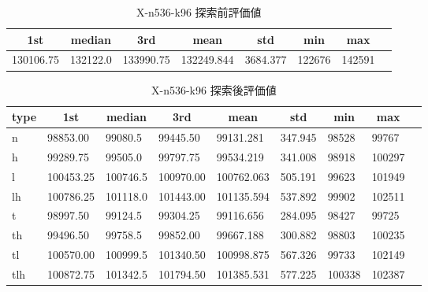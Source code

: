 \begin{table}[htbp]
    \centering
    \caption{X-n536-k96 探索前評価値}
    \begin{tabular}{|l|l|l|l|l|l|l|l|}\hline
    \multicolumn{1}{|c|}{\textbf{1st}}
    &\multicolumn{1}{c|}{\textbf{median}}
    &\multicolumn{1}{c|}{\textbf{3rd}}
    &\multicolumn{1}{c|}{\textbf{mean}}
    &\multicolumn{1}{c|}{\textbf{std}}
    &\multicolumn{1}{c|}{\textbf{min}}
    &\multicolumn{1}{c|}{\textbf{max}}\\\hline
	130106.75 & 132122.0 & 133990.75 & 132249.844 & 3684.377 & 122676 & 142591\\\hline
	\end{tabular}
\end{table}
\begin{table}[htbp]
    \centering
    \caption{X-n536-k96 探索後評価値}
    \begin{tabular}{|l|l|l|l|l|l|l|l|l|}\hline
    \multicolumn{1}{|c|}{\textbf{type}}
    &\multicolumn{1}{|c|}{\textbf{1st}}
    &\multicolumn{1}{c|}{\textbf{median}}
    &\multicolumn{1}{c|}{\textbf{3rd}}
    &\multicolumn{1}{c|}{\textbf{mean}}
    &\multicolumn{1}{c|}{\textbf{std}}
    &\multicolumn{1}{c|}{\textbf{min}}
    &\multicolumn{1}{c|}{\textbf{max}}\\\hline
	n & 98853.00 & 99080.5 & 99445.50 & 99131.281 & 347.945 & 98528 & 99767\\\hline
	h & 99289.75 & 99505.0 & 99797.75 & 99534.219 & 341.008 & 98918 & 100297\\\hline
	l & 100453.25 & 100746.5 & 100970.00 & 100762.063 & 505.191 & 99623 & 101949\\\hline
	lh & 100786.25 & 101118.0 & 101443.00 & 101135.594 & 537.892 & 99902 & 102511\\\hline
	t & 98997.50 & 99124.5 & 99304.25 & 99116.656 & 284.095 & 98427 & 99725\\\hline
	th & 99496.50 & 99758.5 & 99852.00 & 99667.188 & 300.882 & 98803 & 100235\\\hline
	tl & 100570.00 & 100999.5 & 101340.50 & 100998.875 & 567.326 & 99733 & 102149\\\hline
	tlh & 100872.75 & 101342.5 & 101794.50 & 101385.531 & 577.225 & 100338 & 102387\\\hline
	\end{tabular}
\end{table}
